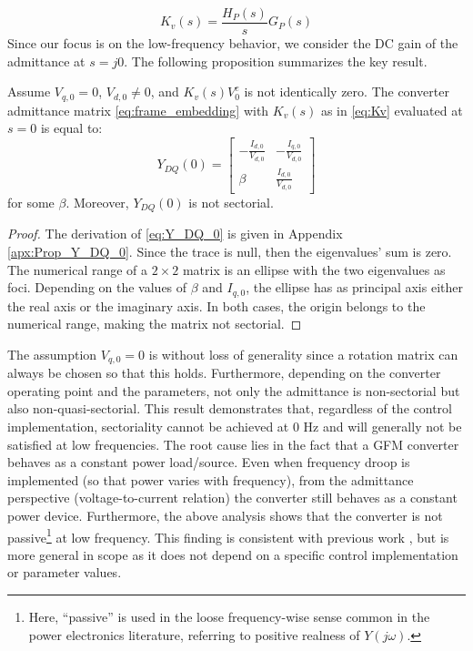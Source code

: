 \begin{equation}
    K_v(s) = \frac{H_P(s)}{s}G_P(s)
    \label{eq:Kv}
\end{equation}
Since our focus is on the low-frequency behavior, we consider the DC gain of the admittance at $s=j0$. The following proposition summarizes the key result.
\begin{prop}
    Assume $V_{q,0}=0$, $V_{d,0}\neq0$, and $K_v(s)V_0^e$ is not identically zero. The converter admittance matrix \eqref{eq:frame_embedding} with $K_v(s)$ as in \eqref{eq:Kv} evaluated at $s=0$ is equal to:
\begin{equation}
    Y_{DQ}(0)=\begin{bmatrix}
        -\frac{I_{d,0}}{V_{d,0}} & -\frac{I_{q,0}}{V_{d,0}} \\
        \beta & \frac{I_{d,0}}{V_{d,0}}
    \end{bmatrix}
    \label{eq:Y_DQ_0}
\end{equation}
for some $\beta$. Moreover, $Y_{DQ}(0)$ is not sectorial.
\label{prop:Y_DQ_0}
\end{prop}
\begin{proof}
    The derivation of \eqref{eq:Y_DQ_0} is given in Appendix \ref{apx:Prop_Y_DQ_0}. 
    Since the trace is null, then the eigenvalues' sum is zero. The numerical range of a $2\times2$ matrix is an ellipse with the two eigenvalues as foci. Depending on the values of $\beta$ and $I_{q,0}$, the ellipse has as principal axis either the real axis or the imaginary axis. In both cases, the origin belongs to the numerical range, making the matrix not sectorial.
\end{proof}

The assumption $V_{q,0}=0$ is without loss of generality since a rotation matrix can always be chosen so that this holds. Furthermore, depending on the converter operating point and the parameters, not only the admittance is non-sectorial but also non-quasi-sectorial.
This result demonstrates that, regardless of the control implementation, sectoriality cannot be achieved at 0 Hz and will generally not be satisfied at low frequencies. The root cause lies in the fact that a GFM converter behaves as a constant power load/source. Even when frequency droop is implemented (so that power varies with frequency), from the admittance perspective (voltage-to-current relation) the converter still behaves as a constant power device.
Furthermore, the above analysis shows that the converter is not passive\footnote{Here, “passive” is used in the loose frequency-wise sense common in the power electronics literature, referring to positive realness of $Y(j\omega)$.} at low frequency. This finding is consistent with previous work \cite{deyAnalysisPassivityCharacteristics2021}, but is more general in scope as it does not depend on a specific control implementation or parameter values.

